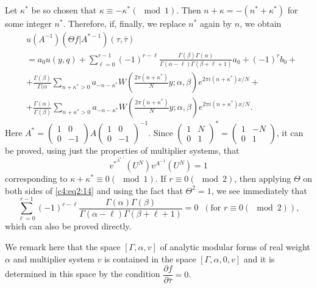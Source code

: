 Let \pageoriginale $\kappa^{\ast}$ be so chosen that $\kappa \equiv
-\kappa^{\ast}(\mod 1)$. Then $n+\kappa=-(n^{\ast}+\kappa^{\ast})$ for
some integer $n^{\ast}$. Therefore, if, finally, we replace
$n^{\ast}$ again by $n$, we obtain
\begin{align*}
& u(A^{-1}) (\Theta f|A^{\ast -1})(\tau,\bar{\tau})\\
& = a_0 u(y,q) + \sum^{r-1}_{\ell=0} (-1)^{r-\ell}
  \frac{\Gamma(\beta)\Gamma(\alpha)}{\Gamma(\alpha-\ell)\Gamma(\beta+\ell+1)}
  a_0 + (-1)^r b_0 + \\
& + \frac{\Gamma(\beta)}{\Gamma(\alpha} \sum_{n+\kappa^{\ast}>0}
a_{-n-\kappa^{\ast}} W (\frac{2\pi(n+\kappa^{\ast})}{N}
y;\alpha,\beta) e^{2\pi i(n+\kappa^{\ast})x/N} +\\
& + \frac{\Gamma(\alpha)}{\Gamma(\beta)} \sum_{n+\kappa^{\ast}>0}
a_{-n-\kappa^{\ast}} W (\frac{2\pi(n+\kappa^{\ast})}{N}y;\alpha,
\beta) e^{2\pi i(n+\kappa^{\ast})x/N}. \tag{14}\label{c4:eq2:14}
\end{align*}
Here $A^{\ast} = \left(\begin{smallmatrix}
  1&0\\0&-1 \end{smallmatrix}\right) A
\left(\begin{smallmatrix}
  1&0\\0&-1\end{smallmatrix}\right)^{-1}$. Since
  $\left(\begin{smallmatrix}
    1&N\\0&1 \end{smallmatrix}\right)^\ast =
  \left(\begin{smallmatrix} 1&-N\\0&1\end{smallmatrix}\right)$, it can
    be proved, using just the properties of multiplier systems, that 
$$
v^{\ast^{A^{\ast^{-1}}}} (U^N) v^{A^{-1}} (U^{N}) =1
$$
corresponding to $\kappa+\kappa^{\ast}\equiv 0(\mod 1)$. If $r\equiv
0(\mod 2)$, then applying $\Theta$ on both sides of \eqref{c4:eq2:14} and using the
fact that $\Theta^2=1$, we see immediately that 
\begin{equation*}
\sum^{r-1}_{\ell=0} (-1)^{r-\ell}
\frac{\Gamma(\alpha)\Gamma(\beta)}{\Gamma(\alpha-\ell)\Gamma(\beta+\ell+1)}
=0 \;\; (\text{for } r\equiv 0(\mod 2)), \tag{15}\label{c4:eq2:15}
\end{equation*}
which can also be proved directly.

We remark here that the space $[\Gamma, \alpha,v]$ of analytic modular
forms of real weight $\alpha$ and multiplier system $v$ is contained
in the space $[\Gamma, \alpha, 0,v]$ and it is determined in this
space by the condition $\dfrac{\partial f}{\partial \bar{\tau}}=0$.

